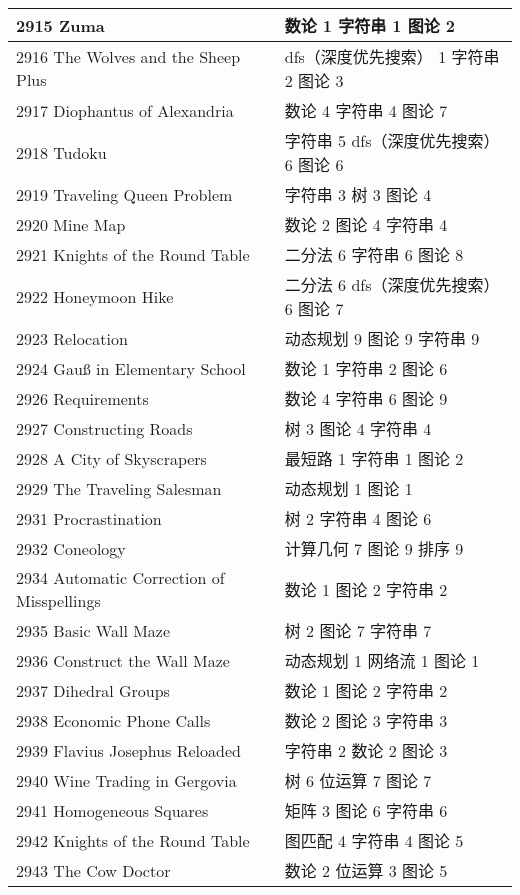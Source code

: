 \begin{longtable}{| p{} | p{} |}
 2915 Zuma  & 数论 1 字符串 1 图论 2 \\ \hline
 2916 The Wolves and the Sheep Plus  & dfs（深度优先搜索） 1 字符串 2 图论 3 \\ \hline
 2917 Diophantus of Alexandria  & 数论 4 字符串 4 图论 7 \\ \hline
 2918 Tudoku  & 字符串 5 dfs（深度优先搜索） 6 图论 6 \\ \hline
 2919 Traveling Queen Problem  & 字符串 3 树 3 图论 4 \\ \hline
 2920 Mine Map  & 数论 2 图论 4 字符串 4 \\ \hline
 2921 Knights of the Round Table  & 二分法 6 字符串 6 图论 8 \\ \hline
 2922 Honeymoon Hike  & 二分法 6 dfs（深度优先搜索） 6 图论 7 \\ \hline
 2923 Relocation  & 动态规划 9 图论 9 字符串 9 \\ \hline
 2924 Gauß in Elementary School  & 数论 1 字符串 2 图论 6 \\ \hline
 2926 Requirements  & 数论 4 字符串 6 图论 9 \\ \hline
 2927 Constructing Roads  & 树 3 图论 4 字符串 4 \\ \hline
 2928 A City of Skyscrapers  & 最短路 1 字符串 1 图论 2 \\ \hline
 2929 The Traveling Salesman  & 动态规划 1 图论 1 \\ \hline
 2931 Procrastination  & 树 2 字符串 4 图论 6 \\ \hline
 2932 Coneology  & 计算几何 7 图论 9 排序 9 \\ \hline
 2934 Automatic Correction of Misspellings  & 数论 1 图论 2 字符串 2 \\ \hline
 2935 Basic Wall Maze  & 树 2 图论 7 字符串 7 \\ \hline
 2936 Construct the Wall Maze  & 动态规划 1 网络流 1 图论 1 \\ \hline
 2937 Dihedral Groups  & 数论 1 图论 2 字符串 2 \\ \hline
 2938 Economic Phone Calls  & 数论 2 图论 3 字符串 3 \\ \hline
 2939 Flavius Josephus Reloaded  & 字符串 2 数论 2 图论 3 \\ \hline
 2940 Wine Trading in Gergovia  & 树 6 位运算 7 图论 7 \\ \hline
 2941 Homogeneous Squares  & 矩阵 3 图论 6 字符串 6 \\ \hline
 2942 Knights of the Round Table  & 图匹配 4 字符串 4 图论 5 \\ \hline
 2943 The Cow Doctor  & 数论 2 位运算 3 图论 5 \\ \hline

\end{longtable}
